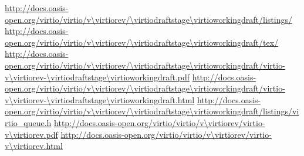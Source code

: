 
\newcommand{\virtioversion}{Virtual I/O Device (VIRTIO) Version \virtiorev}
\newcommand{\virtiospecfile}{virtio-v\virtiorev-\virtiodraftstage\virtioworkingdraft}
\newcommand{\virtiourlbase}{http://docs.oasis-open.org/virtio/virtio/v\virtiorev/\virtiodraftstage\virtioworkingdraft}
\urldef \virtiourllistings\url{\virtiourlbase/listings/}
\urldef \virtiourltex\url{\virtiourlbase/tex/}
\urldef \virtiourlpdf\url{\virtiourlbase/\virtiospecfile.pdf}
\urldef \virtiourlhtml\url{\virtiourlbase/\virtiospecfile.html}
\urldef \virtiourlh\url{\virtiourlbase/listings/virtio_queue.h}
\urldef \virtiourllatestpdf\url{http://docs.oasis-open.org/virtio/virtio/v\virtiorev/virtio-v\virtiorev.pdf}
\urldef \virtiourllatesthtml\url{http://docs.oasis-open.org/virtio/virtio/v\virtiorev/virtio-v\virtiorev.html}
\newcommand{\virtioworkproduct}{Standards Track Work Product}
\newcommand{\virtiooasiscopyright}{Copyright © OASIS Open 2015. All Rights Reserved.}

